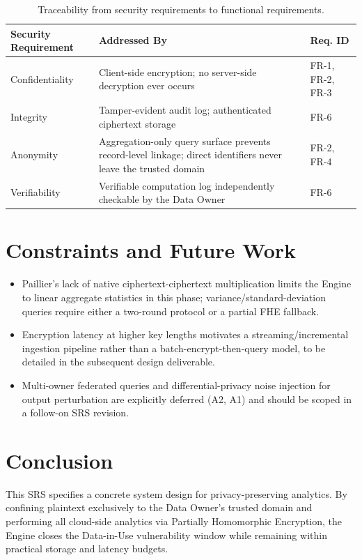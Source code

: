 \documentclass[12pt]{article}
\begin{document}
\begin{table}[H]
\centering
\begin{tabularx}{\textwidth}{l X l}
\toprule
\textbf{Security Requirement} & \textbf{Addressed By} & \textbf{Req. ID} \\
\midrule
Confidentiality & Client-side encryption; no server-side decryption ever occurs & FR-1, FR-2, FR-3 \\
Integrity & Tamper-evident audit log; authenticated ciphertext storage & FR-6 \\
Anonymity & Aggregation-only query surface prevents record-level linkage; direct identifiers never leave the trusted domain & FR-2, FR-4 \\
Verifiability & Verifiable computation log independently checkable by the Data Owner & FR-6 \\
\bottomrule
\end{tabularx}
\caption{Traceability from security requirements to functional requirements.}
\label{tab:traceability}
\end{table}

\section{Constraints and Future Work}
\begin{itemize}[leftmargin=1.5em]
    \item Paillier's lack of native ciphertext-ciphertext multiplication limits the Engine to linear aggregate statistics in this phase; variance/standard-deviation queries require either a two-round protocol or a partial FHE fallback.
    \item Encryption latency at higher key lengths motivates a streaming/incremental ingestion pipeline rather than a batch-encrypt-then-query model, to be detailed in the subsequent design deliverable.
    \item Multi-owner federated queries and differential-privacy noise injection for output perturbation are explicitly deferred (A2, A1) and should be scoped in a follow-on SRS revision.
\end{itemize}

\section{Conclusion}
This SRS specifies a concrete system design for privacy-preserving analytics. By confining plaintext exclusively to the Data Owner's trusted domain and performing all cloud-side analytics via Partially Homomorphic Encryption, the Engine closes the Data-in-Use vulnerability window while remaining within practical storage and latency budgets.
\end{document}
